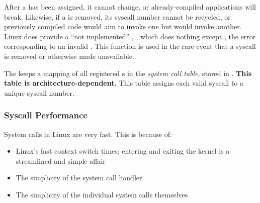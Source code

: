 After a  has been assigned, it cannot change, or already-compiled applications will break.
Likewise, if a  is removed, its syscall number cannot be recycled, or previously compiled code would aim to invoke one  but would invoke another.
Linux does provide a ``not implemented'' , , which does nothing except , the error corresponding to an invalid .
This function is used in the rare event that a syscall is removed or otherwise made unavailable.

The  keeps a mapping of all registered s in the \emph{system call table}, stored in .
\textbf{This table is architecture-dependent.}
This table assigns each valid syscall to a unique syscall number.

\subsubsection{Syscall Performance}\label{subsubsec:Syscall_Performance}
System calls in Linux are very fast.
This is because of:
\begin{itemize}[noitemsep]
\item Linux’s fast context switch times; entering and exiting the kernel is a streamlined and simple affair
\item The simplicity of the system call handler
\item The simplicity of the individual system calls themselves
\end{itemize}

